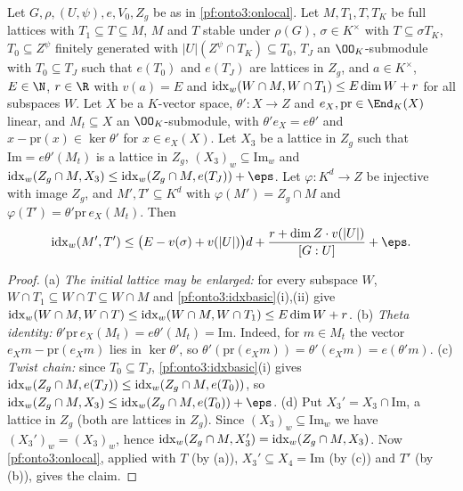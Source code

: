 \begin{proposition}\label{pf:onto3:lcw}
Let $G,\rho,(U,\psi),e,V_0,Z_g$ be as in \cref{pf:onto3:onlocal}. Let $M,T_1,T,T_K$ be full lattices with
$T_1\subseteq T\subseteq M$, $M$ and $T$ stable under $\rho(G)$, $\sigma\in K^\times$ with $T\subseteq\sigma T_K$,
$T_0\subseteq Z^\psi$ finitely generated with $|U|(Z^\psi\cap T_K)\subseteq T_0$, $T_J$ an $\OO_K$-submodule with
$T_0\subseteq T_J$ such that $e(T_0)$ and $e(T_J)$ are lattices in $Z_g$, and $a\in K^\times$, $E\in\N$, $r\in\R$
with $v(a)=E$ and $\operatorname{idx}_w(W\cap M,W\cap T_1)\le E\dim W+r$ for all subspaces $W$. Let $X$ be a
$K$-vector space, $\theta'\colon X\to Z$ and $e_X,\mathrm{pr}\in\End_K(X)$ linear, and $M_t\subseteq X$ an
$\OO_K$-submodule, with $\theta'e_X=e\theta'$ and $x-\mathrm{pr}(x)\in\ker\theta'$ for $x\in e_X(X)$. Let $X_3$ be a
lattice in $Z_g$ such that $\mathrm{Im}=e\theta'(M_t)$ is a lattice in $Z_g$, $(X_3)_w\subseteq\mathrm{Im}_w$ and
$\ontothreeidx_w(Z_g\cap M,X_3)\le\ontothreeidx_w(Z_g\cap M,e(T_J))+\eps$. Let $\varphi\colon K^d\to Z$ be
injective with image $Z_g$, and $M',T'\subseteq K^d$ with $\varphi(M')=Z_g\cap M$ and
$\varphi(T')=\theta'\mathrm{pr}\,e_X(M_t)$. Then
\[
\ontothreeidx_w(M',T')\le\bigl(E-v(\sigma)+v(|U|)\bigr)d+\frac{r+\dim Z\cdot v(|U|)}{[G:U]}+\eps.
\]
\end{proposition}

\begin{proof}
(a) \emph{The initial lattice may be enlarged:} for every subspace $W$, $W\cap T_1\subseteq W\cap T\subseteq W\cap
M$ and \cref{pf:onto3:idxbasic}(i),(ii) give $\operatorname{idx}_w(W\cap M,W\cap T)\le\operatorname{idx}_w(W\cap M,W\cap
T_1)\le E\dim W+r$.
(b) \emph{Theta identity:} $\theta'\mathrm{pr}\,e_X(M_t)=e\theta'(M_t)=\mathrm{Im}$. Indeed, for $m\in M_t$ the
vector $e_X m-\mathrm{pr}(e_Xm)$ lies in $\ker\theta'$, so $\theta'(\mathrm{pr}(e_Xm))=\theta'(e_Xm)=e(\theta'm)$.
(c) \emph{Twist chain:} since $T_0\subseteq T_J$, \cref{pf:onto3:idxbasic}(i) gives
$\operatorname{idx}_w(Z_g\cap M,e(T_J))\le\operatorname{idx}_w(Z_g\cap M,e(T_0))$, so
$\ontothreeidx_w(Z_g\cap M,X_3)\le\ontothreeidx_w(Z_g\cap M,e(T_0))+\eps$.
(d) Put $X_3'=X_3\cap\mathrm{Im}$, a lattice in $Z_g$ (both are lattices in $Z_g$). Since $(X_3)_w\subseteq
\mathrm{Im}_w$ we have $(X_3')_w=(X_3)_w$, hence $\operatorname{idx}_w(Z_g\cap M,X_3')=\operatorname{idx}_w(Z_g\cap M,X_3)$.
Now \cref{pf:onto3:onlocal}, applied with $T$ (by (a)), $X_3'\subseteq X_4=\mathrm{Im}$ (by (c)) and $T'$ (by (b)),
gives the claim.
\end{proof}

